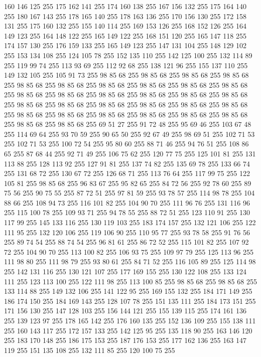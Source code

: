 160 146 125 255 175 162 141 255 174 160 138 255 167 156 132 255 175 164 140 255 180 167 143 255 178 165 140 255 178 163 136 255 170 156 130 255 172 158 131 255 175 160 132 255 155 140 114 255 169 153 126 255 168 152 126 255 164 149 123 255 164 148 122 255 165 149 122 255 168 151 120 255 165 147 118 255 174 157 130 255 176 159 133 255 165 149 123 255 147 131 104 255 148 129 102 255 153 134 108 255 124 105 78 255 152 135 110 255 142 125 100 255 132 114 89 255 119 99 74 255 113 93 69 255 112 92 68 255 138 121 96 255 155 137 110 255 149 132 105 255 105 91 73 255 98 85 68 255 98 85 68 255 98 85 68 255 98 85 68 255 98 85 68 255 98 85 68 255 98 85 68 255 98 85 68 255 98 85 68 255 98 85 68 255 98 85 68 255 98 85 68 255 98 85 68 255 98 85 68 255 98 85 68 255 98 85 68 255 98 85 68 255 98 85 68 255 98 85 68 255 98 85 68 255 98 85 68 255 98 85 68 255 98 85 68 255 98 85 68 255 98 85 68 255 98 85 68 255 98 85 68 255 98 85 68 255
98 85 68 255 98 85 68 255 69 51 27 255 91 72 48 255 95 69 46 255 103 67 48 255 114 69 64 255 93 70 59 255 90 65 50 255 92 67 49 255 98 69 51 255 102 71 53 255 102 71 53 255 100 72 54 255 95 80 60 255 88 71 46 255 94 76 51 255 108 86 65 255 87 68 44 255 92 71 49 255 106 75 62 255 120 77 75 255 125 101 81 255 131 113 88 255 128 113 92 255 127 91 81 255 137 74 82 255 135 69 78 255 133 66 74 255 131 68 72 255 130 67 72 255 126 68 71 255 113 76 64 255 117 99 75 255 122 105 81 255 98 85 68 255 96 83 67 255 95 82 65 255 84 72 56 255 92 78 60 255 89 75 56 255 90 75 55 255 87 72 51 255 97 81 59 255 93 78 57 255 114 98 78 255 104 88 66 255 108 94 73 255 116 101 82 255 104 90 70 255 111 96 76 255 131 116 96 255 115 100 78 255 109 93 71 255 94 78 55 255 88 72 51 255 123 110 91 255 130 117 99 255 145 133 116 255 130 119 103 255 183 174 157 255 132 121 106 255 122 111 95 255 132 120 106 255
119 106 90 255 110 95 77 255 93 78 58 255 91 76 56 255 89 74 54 255 88 74 54 255 96 81 61 255 86 72 52 255 115 101 82 255 107 92 72 255 104 90 70 255 113 100 82 255 106 93 75 255 109 97 79 255 125 113 96 255 111 98 80 255 111 98 79 255 93 80 61 255 84 71 52 255 116 105 89 255 125 114 98 255 142 131 116 255 130 121 107 255 177 169 155 255 130 122 108 255 133 124 111 255 123 113 100 255 122 111 98 255 113 100 85 255 98 85 68 255 98 85 68 255 133 114 88 255 149 132 106 255 141 122 95 255 169 155 132 255 184 171 149 255 186 174 150 255 184 169 143 255 128 107 78 255 151 135 111 255 184 173 151 255 171 156 130 255 147 128 103 255 156 144 121 255 155 139 115 255 174 161 136 255 139 123 97 255 178 165 142 255 176 160 135 255 152 136 109 255 155 138 111 255 160 143 117 255 172 157 133 255 142 125 95 255 135 118 90 255 163 146 120 255 183 170 148 255 186 175 153 255 187 176 153 255 177 162 136 255 163 147 119 255 151 135 108 255 132 111 85 255 120 100 75 255
